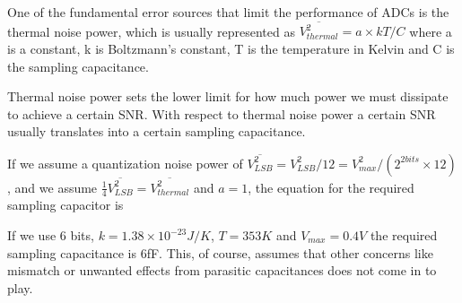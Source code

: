 
One of the fundamental error sources that limit the performance of ADCs is the thermal noise power,
which is usually represented as
$\overline{V_{thermal}^2} = a\times k T/C$
where a is a constant, k is Boltzmann's constant, T is the temperature
in Kelvin and C is the sampling capacitance. 


Thermal noise power sets the lower limit for how much power we must
dissipate to achieve a certain SNR. With respect to thermal noise
power a certain SNR usually translates into a certain sampling
capacitance. 

If we assume a quantization noise power of
$\overline{V_{LSB}^2} = V_{LSB}^2/12= V_{max}^2/(2^{2bits}\times
  12)$
, and we assume $\frac{1}{4}\overline{V_{LSB}^2} = \overline{V_{thermal}^2}$ and
$a = 1$, the equation for the required sampling capacitor is

If we use 6 bits, $k=1.38\times10^{-23} J/K$, $T=353 K$ and $V_{max} = 0.4V$ 
the required sampling capacitance is 6fF. This, of course, assumes that other concerns like
mismatch or unwanted effects from parasitic capacitances does not come
in to play.


